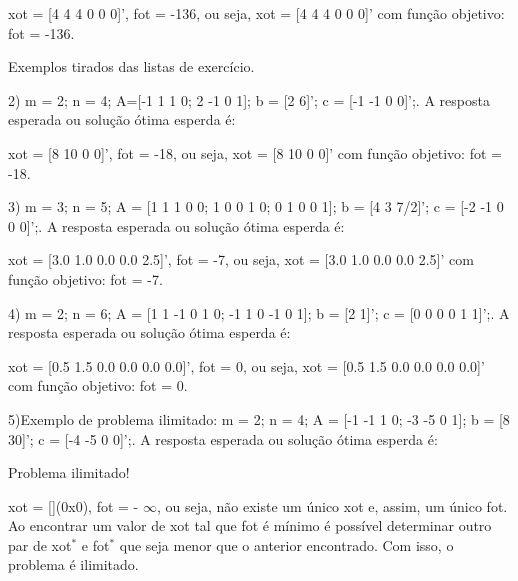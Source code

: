 \documentclass[10pt]{article}
\begin{document}
xot = [4 4 4 0 0 0]', fot = -136, ou seja, xot = [4 4 4 0 0 0]' com função objetivo: fot = -136.
\newline

Exemplos tirados das listas de exercício.
\newline

2) m = 2; n = 4; A=[-1 1 1 0; 2 -1 0 1]; b = [2 6]'; c = [-1 -1 0 0]';. A resposta esperada ou solução ótima esperda é:
\newline

xot = [8 10 0 0]', fot = -18, ou seja, xot = [8 10 0 0]' com função objetivo: fot = -18.
\newline

3) m = 3; n = 5; A = [1 1 1 0 0; 1 0 0 1 0; 0 1 0 0 1]; b = [4 3 7/2]'; c = [-2 -1 0 0 0]';. A resposta esperada ou solução ótima esperda é:
\newline

xot = [3.0 1.0 0.0 0.0 2.5]', fot = -7, ou seja, xot = [3.0 1.0 0.0 0.0 2.5]' com função objetivo: fot = -7.
\newline

4) m = 2; n = 6; A = [1 1 -1 0 1 0; -1 1 0 -1 0 1]; b = [2 1]'; c = [0 0 0 0 1 1]';. A resposta esperada ou solução ótima esperda é:
\newline

xot = [0.5 1.5 0.0 0.0 0.0 0.0]', fot = 0, ou seja, xot = [0.5 1.5 0.0 0.0 0.0 0.0]' com função objetivo: fot = 0.
\newline

5)Exemplo de problema ilimitado: m = 2; n = 4; A = [-1 -1 1 0; -3 -5 0 1]; b = [8 30]'; c = [-4 -5 0 0]';. A resposta esperada ou solução ótima esperda é:
\newline

Problema ilimitado!
\newline

xot = [](0x0), fot = - $\infty$, ou seja, não existe um único xot e, assim, um único fot. Ao encontrar um valor de xot tal que fot é mínimo é possível determinar outro par de xot$^{*}$ e fot$^{*}$ que seja menor que o anterior encontrado. Com isso, o problema é ilimitado.
\end{document}
